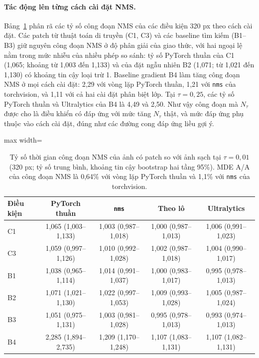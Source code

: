 \documentclass[a4paper,fleqn]{cas-dc}
\newcommand{\Ntau}{N_{\tau}}
\begin{document}
\paragraph{Tác động lên từng cách cài đặt NMS.}
Bảng~\ref{tab:impl} phân rã các tỷ số công đoạn NMS của các điều kiện 320 px theo cách cài đặt. Các patch từ thuật toán di truyền (C1, C3) và các baseline tìm kiếm (B1--B3) giữ nguyên công đoạn NMS ở độ phân giải của giao thức, với hai ngoại lệ nằm trong mức nhiễu của nhiều phép so sánh: tỷ số PyTorch thuần của C1 (1,065; khoảng từ 1,003 đến 1,133) và của đặt ngẫu nhiên B2 (1,071; từ 1,021 đến 1,130) có khoảng tin cậy loại trừ 1. Baseline gradient B4 làm tăng công đoạn NMS ở mọi cách cài đặt: 2,29 với vòng lặp PyTorch thuần, 1,21 với \texttt{nms} của torchvision, và 1,11 với cả hai cài đặt phân biệt lớp. Tại $\tau=0{,}25$, các tỷ số PyTorch thuần và Ultralytics của B4 là 4,49 và 2,50. Như vậy công đoạn mà $\Ntau$ được cho là điều khiển có đáp ứng với mức tăng $\Ntau$ thật, và mức đáp ứng phụ thuộc vào cách cài đặt, đúng như các đường cong đáp ứng liều gợi ý.

\begin{table}[!tp]
\centering\small
\caption{Tỷ số thời gian công đoạn NMS của ảnh có patch so với ảnh sạch tại $\tau=0{,}01$ (320 px; tỷ số trung bình, khoảng tin cậy bootstrap hai tầng 95\%). MDE A/A của công đoạn NMS là 0,64\% với vòng lặp PyTorch thuần và 1,1\% với \texttt{nms} của torchvision.}
\label{tab:impl}
\begin{adjustbox}{max width=\textwidth}
\begin{tabular}{@{}lcccc@{}}
\toprule
Điều kiện & PyTorch thuần & \texttt{nms} & Theo lô & Ultralytics \\
\midrule
C1 & 1,065 (1,003--1,133) & 1,003 (0,987--1,018) & 1,000 (0,987--1,013) & 1,006 (0,991--1,023) \\
C3 & 1,059 (0,997--1,126) & 1,010 (0,992--1,028) & 1,002 (0,987--1,018) & 1,004 (0,990--1,017) \\
B1 & 1,038 (0,965--1,114) & 1,014 (0,991--1,037) & 1,000 (0,983--1,017) & 0,995 (0,978--1,013) \\
B2 & 1,071 (1,021--1,130) & 1,022 (0,997--1,053) & 1,009 (0,993--1,028) & 1,005 (0,987--1,024) \\
B3 & 1,051 (0,975--1,131) & 1,003 (0,981--1,028) & 0,995 (0,978--1,013) & 0,993 (0,974--1,013) \\
B4 & 2,285 (1,894--2,735) & 1,209 (1,170--1,248) & 1,107 (1,083--1,131) & 1,107 (1,082--1,131) \\
\bottomrule
\end{tabular}
\end{adjustbox}
\end{table}
\end{document}
